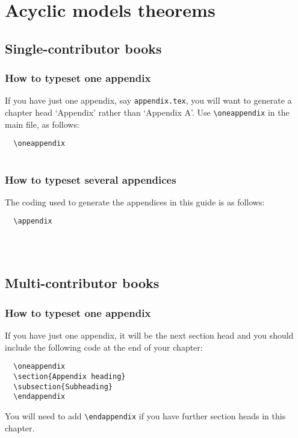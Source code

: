 
\chapter{Acyclic models theorems}

\section{Single-contributor books}
\subsection{How to typeset one appendix}
If you have just one appendix, say \verb"appendix.tex", you will want to generate a chapter head `Appendix' rather than `Appendix A'. Use \verb"\oneappendix" in the main file, as follows:
\begin{verbatim}
  \oneappendix
  
\end{verbatim}

\subsection{How to typeset several appendices}
The coding used to generate the appendices in this guide is as follows:
\begin{verbatim}
  \appendix
  
  
  
\end{verbatim}

\section{Multi-contributor books}

\subsection{How to typeset one appendix}
If you have just one appendix, it will be the next section head and you should include the following code at the end of your chapter:
\begin{verbatim}
  \oneappendix
  \section{Appendix heading}
  \subsection{Subheading}
  \endappendix
\end{verbatim}
You will need to add \verb"\endappendix" if you have further section heads in this chapter.


